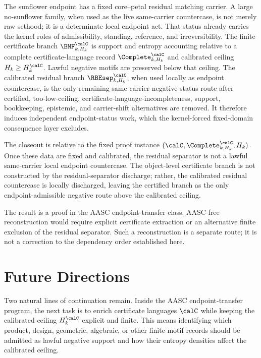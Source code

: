 \documentclass[11pt]{article}
\begin{document}
The sunflower endpoint has a fixed core--petal residual matching carrier.  A large no-sunflower family, when used as the live same-carrier countercase, is not merely raw sethood; it is a determinate local endpoint act.  That status already carries the kernel roles of admissibility, standing, reference, and irreversibility.  The finite certificate branch \(\BMF^{\calC}_{k,H_k}\) is support and entropy accounting relative to a complete certificate-language record \(\Complete^{\calC}_{k,H_k}\) and calibrated ceiling \(H_k\ge H_k^{\calC}\).  Lawful negative motifs are preserved below that ceiling.  The calibrated residual branch \(\RBEsep^{\calC}_{k,H_k}\), when used locally as endpoint countercase, is the only remaining same-carrier negative status route after certified, too-low-ceiling, certificate-language-incompleteness, support, bookkeeping, epistemic, and carrier-shift alternatives are removed.  It therefore induces independent endpoint-status work, which the kernel-forced fixed-domain consequence layer excludes.

The closeout is relative to the fixed proof instance \((\calC,\Complete^{\calC}_{k,H_k},H_k)\).  Once these data are fixed and calibrated, the residual separator is not a lawful same-carrier local endpoint countercase.  The object-level certificate branch is not constructed by the residual-separator discharge; rather, the calibrated residual countercase is locally discharged, leaving the certified branch as the only endpoint-admissible negative route above the calibrated ceiling.

The result is a proof in the AASC endpoint-transfer class.  AASC-free reconstruction would require explicit certificate extraction or an alternative finite exclusion of the residual separator.  Such a reconstruction is a separate route; it is not a correction to the dependency order established here.

\section{Future Directions}

Two natural lines of continuation remain.  Inside the AASC endpoint-transfer program, the next task is to enrich certificate languages \(\calC\) while keeping the calibrated ceiling \(H_k^{\calC}\) explicit and finite.  This means identifying which product, design, geometric, algebraic, or other finite motif records should be admitted as lawful negative support and how their entropy densities affect the calibrated ceiling.
\end{document}
